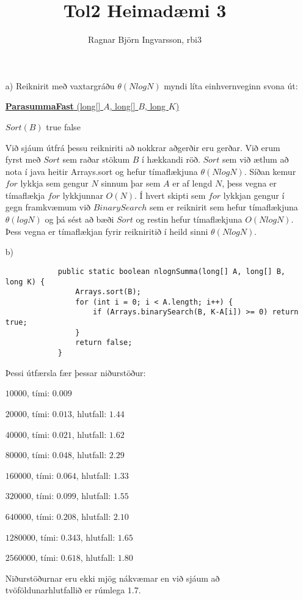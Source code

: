 \documentclass{article}
\title{Tol2 Heimadæmi 3}
\author{Ragnar Björn Ingvarsson, rbi3}
\begin{document}
	
	\maketitle
	
	\section{}
	\begin{itemize}
		\item[a)] Reiknirit með vaxtargráðu $\theta(NlogN)$ myndi líta einhvernveginn svona út:
		
		\begin{algorithmic}
			\State \underline{\textbf{ParasummaFast} (long[] $A$, long[] $B$, long $K$)}
			
			\State $Sort(B)$
					\State \Return true
				\EndIf
			\EndFor
			\State \Return false
		\end{algorithmic}
		
		Við sjáum útfrá þessu reikniriti að nokkrar aðgerðir eru gerðar. Við erum fyrst með $Sort$ sem raðar stökum $B$ í hækkandi röð. $Sort$ sem við ætlum að nota í java heitir Arrays.sort og hefur tímaflækjuna $\theta(NlogN)$. Síðan kemur $for$ lykkja sem gengur $N$ sinnum þar sem $A$ er af lengd $N$, þess vegna er tímaflækja $for$ lykkjunnar $O(N)$. Í hvert skipti sem $for$ lykkjan gengur í gegn framkvæmum við $BinarySearch$ sem er reiknirit sem hefur tímaflækjuna $\theta(logN)$ og þá sést að bæði $Sort$ og restin hefur tímaflækjuna $O(NlogN)$. Þess vegna er tímaflækjan fyrir reikniritið í heild sinni $\theta(NlogN)$.

		\item[b)] 
		
		\begin{verbatim}
			public static boolean nlognSumma(long[] A, long[] B, long K) {
			    Arrays.sort(B);
			    for (int i = 0; i < A.length; i++) {
			        if (Arrays.binarySearch(B, K-A[i]) >= 0) return true;
			    }
			    return false;
			}
		\end{verbatim}
		
		Þessi útfærsla fær þessar niðurstöður:
		\begin{center}
			$10000$, tími: $0.009$
			
			$20000$, tími: $0.013$, hlutfall: $1.44$
			
			$40000$, tími: $0.021$, hlutfall: $1.62$
			
			$80000$, tími: $0.048$, hlutfall: $2.29$
			
			$160000$, tími: $0.064$, hlutfall: $1.33$
			
			$320000$, tími: $0.099$, hlutfall: $1.55$

			$640000$, tími: $0.208$, hlutfall: $2.10$
			
			$1280000$, tími: $0.343$, hlutfall: $1.65$
			
			$2560000$, tími: $0.618$, hlutfall: $1.80$
		\end{center}
		
		Niðurstöðurnar eru ekki mjög nákvæmar en við sjáum að tvöföldunarhlutfallið er rúmlega $1.7$.
		
	\end{itemize}
	
\end{document}

